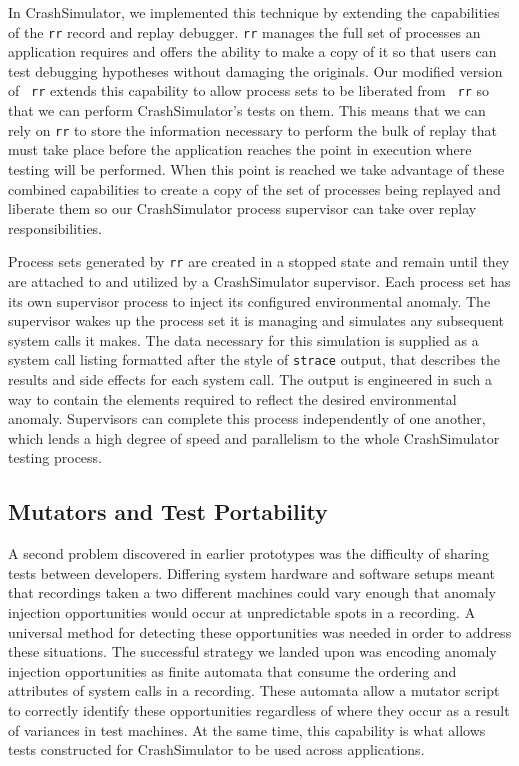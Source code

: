 In CrashSimulator, we implemented this technique by extending the
capabilities of the {\tt rr} record and replay debugger.  {\tt rr} manages
the full set of processes an application requires and offers the ability to
make a copy of it so that users can test debugging
hypotheses without damaging the originals.  Our modified version of {\tt
rr} extends this capability to allow process sets to be liberated from {\tt
rr} so that we can perform CrashSimulator's tests on them.
This means that we can rely on {\tt rr}
to store the information necessary to perform the bulk of
replay that must take place before the application reaches the point in
execution where testing will be performed.  When this point is reached we
take advantage of these combined capabilities
to create a
copy of the set of processes being replayed and liberate them so our
CrashSimulator process supervisor can take over replay responsibilities.

Process sets generated by {\tt rr} are created in a stopped state and
remain until they are attached to and utilized by a CrashSimulator
supervisor.  Each process set has its own supervisor process to inject
its configured environmental anomaly.  The
supervisor wakes up the process set it is managing and simulates any
subsequent system calls it makes.  The data necessary for this
simulation is
supplied as a system call listing formatted after the style of {\tt strace}
output, that describes the results and side effects for each system
call. The output is engineered in such a way to contain the
elements required to reflect the
desired environmental anomaly.  Supervisors can complete this
process independently of one another, which lends a
high degree of speed and
parallelism to the whole CrashSimulator testing process.


\subsection{Mutators and Test Portability}

A second problem discovered in earlier prototypes was the difficulty of
sharing tests between developers.  Differing system hardware and software
setups meant that recordings taken a two different machines could vary
enough that anomaly injection opportunities would occur at unpredictable
spots in a recording.  A universal method for detecting these opportunities
was needed in order to address these situations.  The successful strategy
we landed upon was encoding anomaly injection opportunities as finite
automata that consume the ordering and attributes of system calls in a
recording.  These automata allow a mutator script to correctly identify
these opportunities regardless of where they occur as a result of variances
in test machines.  At the same time, this capability is what allows tests
constructed for CrashSimulator to be used across applications.


